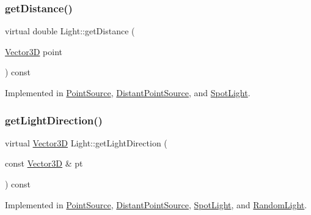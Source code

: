 \mbox{\label{classLight_a4a7a5a9d4fc67da122c3ce75f6075093}} 
\subsubsection{\texorpdfstring{getDistance()}{getDistance()}}
{\footnotesize\ttfamily virtual double Light\+::get\+Distance (\begin{DoxyParamCaption}\item[{\mbox{\hyperlink{classVector3D}{Vector3D}}}]{point }\end{DoxyParamCaption}) const\hspace{0.3cm}{\ttfamily [pure virtual]}}



Implemented in \mbox{\hyperlink{classPointSource_a5f1af9abccf0657b9398555c935bb8bc}{Point\+Source}}, \mbox{\hyperlink{classDistantPointSource_a5d08b5655fc7fc09e5c0d2a0f3046e16}{Distant\+Point\+Source}}, and \mbox{\hyperlink{classSpotLight_a117f7918773e193f67714765c5370418}{Spot\+Light}}.

\mbox{\label{classLight_ac075908cf22e9ca9f289c1226d133664}} 
\subsubsection{\texorpdfstring{getLightDirection()}{getLightDirection()}}
{\footnotesize\ttfamily virtual \mbox{\hyperlink{classVector3D}{Vector3D}} Light\+::get\+Light\+Direction (\begin{DoxyParamCaption}\item[{const \mbox{\hyperlink{classVector3D}{Vector3D}} \&}]{pt }\end{DoxyParamCaption}) const\hspace{0.3cm}{\ttfamily [pure virtual]}}



Implemented in \mbox{\hyperlink{classPointSource_a02a13a7b955088e32324bfb3d49b1ace}{Point\+Source}}, \mbox{\hyperlink{classDistantPointSource_a740ee32c41e2ef6deec1137c86f5b73a}{Distant\+Point\+Source}}, \mbox{\hyperlink{classSpotLight_a051e210b637edf37bf2b8d49149a13a4}{Spot\+Light}}, and \mbox{\hyperlink{classRandomLight_a70c038d63e66f520a296dccddcf9035f}{Random\+Light}}.

